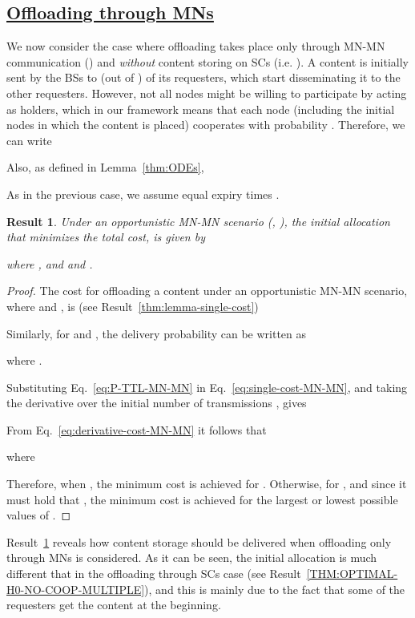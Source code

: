 \documentclass[10pt,conference,letterpaper]{IEEEtran}
\newtheorem{result}{Result}
\newcommand{\eq}[1]{Eq.~\eqref{#1}}
\begin{document}
\subsection*{\underline{Offloading through MNs}} 
We now consider the case where offloading takes place only through MN-MN communication () and \textit{without} content storing on SCs (i.e. ). A content is initially sent by the BSs to  (out of ) of its requesters, which start disseminating it to the other requesters. However, not all nodes might be willing to participate by acting as holders, which in our framework means that each node (including the initial nodes in which the content is placed) cooperates with probability . Therefore, we can write 

Also, as defined in Lemma~\ref{thm:ODEs},


As in the previous case, we assume equal expiry times .

\begin{result}\label{THM:OPTIMAL-H0-MN-MN}
Under an \textit{opportunistic MN-MN scenario} (, ), the initial allocation  that minimizes the total cost, is given by

where , and  and .
\end{result}
\begin{proof}
The cost for offloading a content  under an opportunistic MN-MN scenario, where  and , is (see Result~\ref{thm:lemma-single-cost})

Similarly, for  and , the delivery probability  can be written as

where .

Substituting \eq{eq:P-TTL-MN-MN} in \eq{eq:single-cost-MN-MN}, and taking the derivative over the initial number of transmissions , gives

From \eq{eq:derivative-cost-MN-MN} it follows that 

where

Therefore, when , the minimum cost is achieved for . Otherwise, for , and since it must hold that , the minimum cost is achieved for the largest or lowest possible values of .
\end{proof}

Result~\ref{THM:OPTIMAL-H0-MN-MN} reveals how content storage should be delivered when offloading only through MNs is considered. As it can be seen, the initial allocation is much different that in the offloading through SCs case (see Result~\ref{THM:OPTIMAL-H0-NO-COOP-MULTIPLE}), and this is mainly due to the fact that some of the requesters get the content at the beginning.
\end{document}
